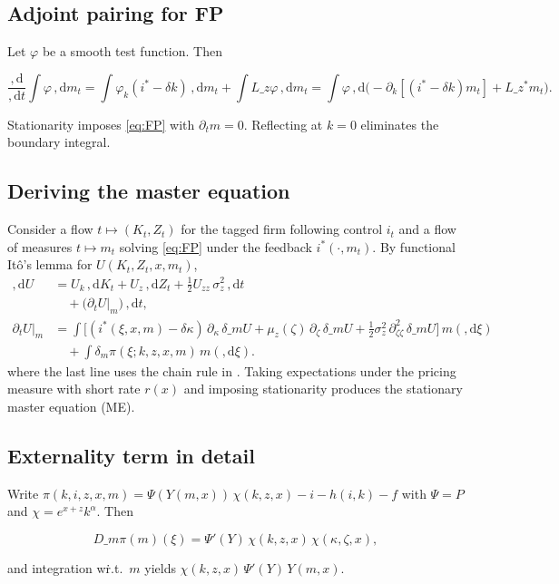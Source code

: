 \documentclass[11pt,letterpaper,oneside]{article}
\numberwithin{equation}{section}
\newcommand{\1}{\mathbf{1}}
\newcommand{\diff}{,\mathrm{d}}
\newcommand{\Lz}{L\_z}
\newcommand{\Lzadj}{L\_z^{\!*}}
\newcommand{\dmU}{\delta\_m U}
\newcommand{\Dm}{D\_m}
\begin{document}
\subsection{Adjoint pairing for FP}
Let $\varphi$ be a smooth test function. Then

$$
\frac{\diff}{\diff t}\int \varphi\,\diff m_t
= \int \varphi_k (i^*-\delta k)\,\diff m_t + \int \Lz \varphi\,\diff m_t
= \int \varphi\,\diff\Big(-\partial_k[(i^*-\delta k)m_t]+\Lzadj m_t\Big).
$$

Stationarity imposes \eqref{eq:FP} with $\partial_t m=0$. Reflecting at $k=0$ eliminates the boundary integral.

\subsection{Deriving the master equation}
Consider a flow $t\mapsto (K_t,Z_t)$ for the tagged firm following control $i_t$ and a flow of measures $t\mapsto m_t$ solving \eqref{eq:FP} under the feedback $i^*(\cdot,m_t)$. By functional Itô's lemma for $U(K_t,Z_t,x,m_t)$,
\begin{align*}
\diff U &= U_k\,\diff K_t + U_z\,\diff Z_t + \tfrac12 U_{zz}\,\sigma_z^2\,\diff t \\
        &\quad + \big(\partial_t U\big|_{m}\big)\,\diff t, \\
\partial_t U\big|_{m} &= \int \Big[ (i^*(\xi,x,m)-\delta\kappa)\,\partial_{\kappa}\,\dmU
  +\mu_z(\zeta)\,\partial_{\zeta}\,\dmU
  +\tfrac12\sigma_z^2\,\partial_{\zeta\zeta}^2\,\dmU\Big] \, m(\diff \xi) \\
  &\quad + \int \delta_m \pi(\xi; k,z,x,m) \, m(\diff \xi).
\end{align*}
  where the last line uses the chain rule in . Taking expectations under the pricing measure with short rate $r(x)$ and imposing stationarity produces the stationary master equation (ME).

\subsection{Externality term in detail}
Write $\pi(k,i,z,x,m)=\Psi(Y(m,x))\,\chi(k,z,x)-i-h(i,k)-f$ with $\Psi=P$ and $\chi=e^{x+z}k^\alpha$. Then

$$
\Dm\pi(m)(\xi)=\Psi'(Y)\,\chi(k,z,x)\,\chi(\kappa,\zeta,x),
$$

and integration w\.r.t.\ $m$ yields $\chi(k,z,x)\,\Psi'(Y)\,Y(m,x)$.

\end{document}
